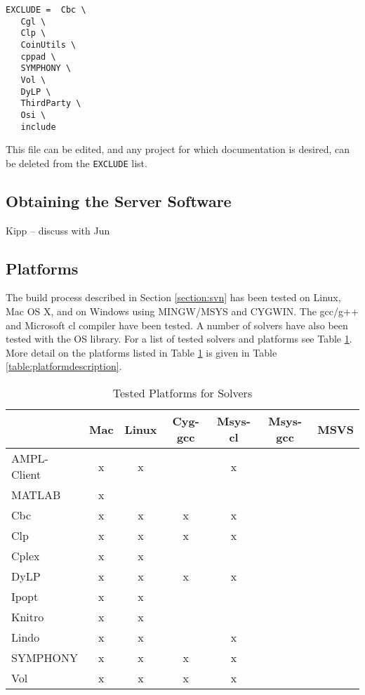 \documentclass[11pt]{article}
\renewcommand{\_}{{\char"5F}}
\renewcommand{\{}{{\char"7B}}
\renewcommand{\}}{{\char"7D}}
\renewcommand{\^}{{\char"0D}}
\renewcommand{\'}{{\char"0D}}
\begin{document}
\begin{verbatim}
EXCLUDE =  Cbc \ 
   Cgl \
   Clp \
   CoinUtils \
   cppad \
   SYMPHONY \
   Vol \
   DyLP \
   ThirdParty \
   Osi \
   include
\end{verbatim}

This file can be edited, and any project for which documentation is desired, can be deleted from the {\tt EXCLUDE} list.

\subsection{Obtaining the Server Software}


Kipp -- discuss with Jun

\subsection{Platforms}

The build process described in Section \ref{section:svn} has been tested on Linux, Mac OS X, and on Windows using  MINGW/MSYS and CYGWIN. The  gcc/g++ and Microsoft  cl compiler have been tested. A number of solvers have also been tested with the OS library. For a list of tested solvers and platforms see Table \ref{table:testedplatforms}.  More detail on the platforms listed in Table  \ref{table:testedplatforms} is given in Table \ref{table:platformdescription}.


\begin{table}
\caption{Tested Platforms for Solvers}
\centering
\label{table:testedplatforms}
\vskip 8pt
 \begin{tabular}{l|c|c|c|c|c|c|}
 &Mac&Linux&Cyg-gcc&Msys-cl&Msys-gcc&MSVS \\ \hline
AMPL-Client &x&x&&x&& \\ \hline
MATLAB &x&&&&& \\ \hline
Cbc &x&x&x&x&& \\ \hline
Clp &x&x&x&x&& \\ \hline
Cplex &x&x&&&& \\ \hline
DyLP &x&x&x&x&& \\ \hline
Ipopt &x&x&&&& \\ \hline
Knitro &x&x&&&& \\ \hline
Lindo &x&x&&x&& \\ \hline
SYMPHONY &x&x&x&x&& \\ \hline
Vol &x&x&x&x&& \\ \hline
\end{tabular}
\end{table}
 
\end{document}
